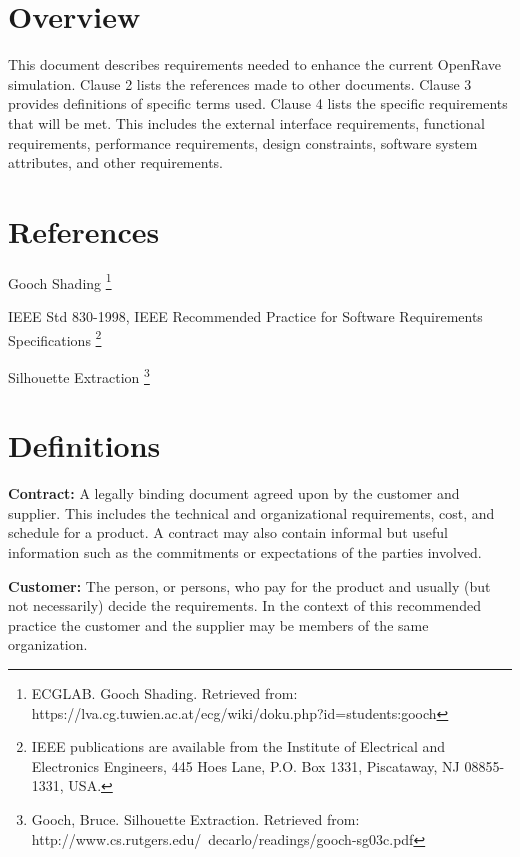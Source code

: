 \documentclass[10pt,journal,compsoc]{IEEEtran}
\begin{document}
\newpage

\tableofcontents

\newpage
\begin{flushleft}
\section{Overview}
\vspace{3mm}
This document describes requirements needed to enhance the current OpenRave simulation. 
Clause 2 lists the references made to other documents. 
Clause 3 provides definitions of specific terms used.
Clause 4 lists the specific requirements that will be met.
This includes the external interface requirements, functional requirements, performance requirements, design constraints, software system attributes, and other requirements.

\section{References}

Gooch Shading \footnote{\label{note1}ECGLAB. Gooch Shading. Retrieved from: https://lva.cg.tuwien.ac.at/ecg/wiki/doku.php?id=students:gooch}
\vspace{3mm}

IEEE Std 830-1998, IEEE Recommended Practice for Software Requirements Specifications \footnote{\label{note2}IEEE publications are available from the Institute of Electrical and Electronics Engineers, 445 Hoes Lane, P.O. Box 1331, Piscataway, NJ 08855-1331, USA.}
\vspace{3mm}

Silhouette Extraction \footnote{\label{note3}Gooch, Bruce. Silhouette Extraction. Retrieved from: http://www.cs.rutgers.edu/~decarlo/readings/gooch-sg03c.pdf}

\section{Definitions}

\vspace{3mm}
\textbf{Contract:}
A legally binding document agreed upon by the customer and supplier. This includes the technical and organizational requirements, cost, and schedule for a product. A contract may also contain informal but useful information such as the commitments or expectations of the parties involved.

\vspace{3mm}
\textbf{Customer:}
The person, or persons, who pay for the product and usually (but not necessarily) decide the requirements. In the context of this recommended practice the customer and the supplier may be members of the same organization.


\end{flushleft}
\end{document}
